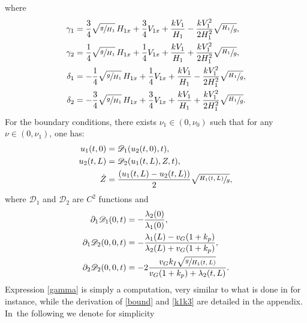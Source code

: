 \documentclass[11pt]{article}
\numberwithin{equation}{section}
\let\mathcal\mathscr
\theoremstyle{definition}
\begin{document}
where\vspace*{-7pt}
\begin{equation}
\begin{split}
\gamma_{1}&=\frac{3}{4}\sqrt{\sfrac{g}{H_{1}}}\,H_{1x}+\frac{3}{4}V_{1x}+\frac{kV_{1}}{H_{1}}-\frac{kV_{1}^{2}}{2H_{1}^{2}}\sqrt{\sfrac{H_{1}}{g}},\\
\gamma_{2}&=\frac{1}{4}\sqrt{\sfrac{g}{H_{1}}}\,H_{1x}+\frac{1}{4}V_{1x}+\frac{kV_{1}}{H_{1}}+\frac{kV_{1}^{2}}{2H_{1}^{2}}\sqrt{\sfrac{H_{1}}{g}},\\
\delta_{1}&=-\frac{1}{4}\sqrt{\sfrac{g}{H_{1}}}\,H_{1x}+\frac{1}{4}V_{1x}+\frac{kV_{1}}{H_{1}}-\frac{kV_{1}^{2}}{2H_{1}^{2}}\sqrt{\sfrac{H_{1}}{g}},\\
\delta_{2}&=-\frac{3}{4}\sqrt{\sfrac{g}{H_{1}}}\,H_{1x}+\frac{3}{4}V_{1x}+\frac{kV_{1}}{H_{1}}+\frac{kV_{1}^{2}}{2H_{1}^{2}}\sqrt{\sfrac{H_{1}}{g}}.
\end{split}
\label{gamma}
\end{equation}
{For} the boundary conditions, there exists $\nu_{1}\in(0,\nu_{0})$ such that for any $\nu\in(0,\nu_{1})$, one has:\vspace*{-5pt}
\begin{equation}
\begin{split}
u_{1}(t,0)&=\mathcal{D}_{1}(u_{2}(t,0),t),\\
u_{2}(t,L)&=\mathcal{D}_{2}(u_{1}(t,L),Z,t),\\
\dot Z&=\frac{(u_{1}(t,L)-u_{2}(t,L))}{2}\sqrt{\sfrac{H_{1}(t,L)}{g}},
\end{split}
\label{bound}
\end{equation}
where $\mathcal{D}_{1}$ and $\mathcal{D}_{2}$ are $C^{2}$ functions and\vspace*{-5pt}
\begin{equation}
\begin{split}
\partial_{1}\mathcal{D}_{1}(0,t)&=-\frac{\lambda_{2}(0)}{\lambda_{1}(0)},\\
\partial_{1}\mathcal{D}_{2}(0,0,t)&=-\frac{\lambda_{1}(L)-v_{G}(1+k_{p})}{\lambda_{2}(L)+v_{G}(1+k_{p})},\\
\partial_{2}\mathcal{D}_{2}(0,0,t)&=-2\frac{v_{G}k_{I}\sqrt{\sfrac{g}{H_{1}(t,L)}}}{v_{G}(1+k_{p})+\lambda_{2}(t,L)}.
\end{split}
\label{k1k3}
\end{equation}
Expression \eqref{gamma} is simply a computation, very similar to what is done in \cite{HS} for instance, while the derivation of \eqref{bound} and \eqref{k1k3} are detailed in the appendix. In~the following we denote for simplicity
\end{document}
